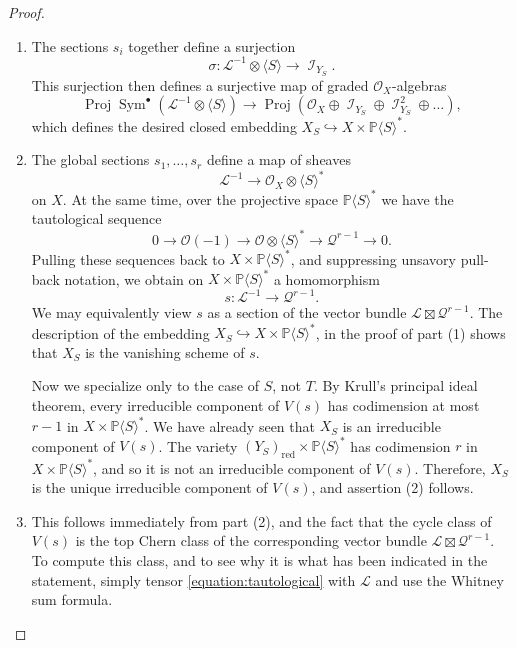 \documentclass[reqno, 11pt]{amsart}
\theoremstyle{plain}
\theoremstyle{remark}
\renewcommand{\P}{\mathbb{P}}
\DeclareMathOperator{\I}{\mathcal{I}}
\renewcommand{\O}{\mathscr{O}}
\renewcommand{\L}{\mathscr{L}}
\DeclareMathOperator{\Sym}{Sym}
\DeclareMathOperator{\red}{red}
\DeclareMathOperator{\Proj}{Proj}
\begin{document}
    \begin{proof}
        \begin{enumerate}
        \item The sections $s_i$ together define a surjection \[\sigma: \L^{-1}\otimes \langle S \rangle \to \I_{Y_{S}}.\] This surjection then defines a surjective map of graded $\O_X$-algebras \[\Proj \Sym^{\bullet}(\L^{-1}\otimes \langle S \rangle) \to \Proj (\O_X \oplus \I_{Y_{S}} \oplus \I_{Y_{S}}^{2} \oplus \dots),\] which defines the desired closed embedding $X_{S} \hookrightarrow X \times \P \langle S \rangle^{*}$. 
        \item   The global sections $s_1 ,\dots, s_r$ define a map of sheaves \[\L^{-1} \to \O_{X} \otimes \langle S \rangle^{*}\] on $X$.   At the same time, over the projective space $\P \langle S \rangle^{*}$ we have the tautological sequence 
        \begin{equation}
            \label{equation:tautological}
            0 \to \O(-1) \to \O \otimes \langle S \rangle^{*} \to \mathscr{Q}^{r-1} \to 0.
        \end{equation}
        Pulling these sequences back to $X \times \P \langle S \rangle^{*}$, and suppressing unsavory pull-back notation, we obtain on $X \times \P \langle S \rangle^{*}$ a homomorphism \[s : \L^{-1} \to \mathscr{Q}^{r-1}.\] We may equivalently view $s$ as a section of the vector bundle $\L \boxtimes \mathscr{Q}^{r-1}$.  The description  of the embedding $X_S \hookrightarrow X \times \P \langle S \rangle^{*}$, in the proof of part (1) shows that $X_S$ is the vanishing scheme of $s$.
        
        Now we specialize only to the case of $S$, not $T$. By Krull's principal ideal theorem, every irreducible component of $V(s)$ has codimension at most $r-1$ in $X \times \P \langle S \rangle^{*}$.  We have already seen that $X_{S}$ is an irreducible component of $V(s)$.  The variety $(Y_{S})_{\red} \times \P \langle S \rangle^{*}$  has codimension $r$ in $X \times \P \langle S \rangle^{*}$, and so it is not an irreducible component of $V(s)$.  Therefore, $X_{S}$ is the unique irreducible component of $V(s)$, and assertion (2) follows.
    
        \item This follows immediately from part (2), and the fact that the cycle class of $V(s)$ is the top Chern class of the corresponding vector bundle $\L \boxtimes \mathscr{Q}^{r-1}$.  To compute this class, and to see why it is what has been indicated in the statement, simply tensor \eqref{equation:tautological} with $\L$ and use the Whitney sum formula.
        

\end{enumerate}
\end{proof}
\end{document}
